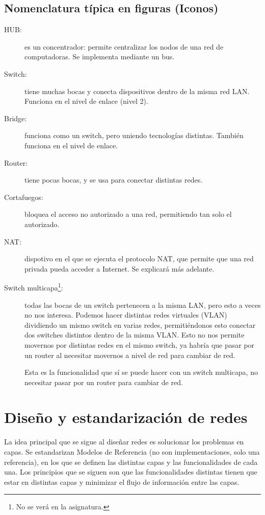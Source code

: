 \subsection{Nomenclatura típica en figuras (Iconos)}
\begin{description}
    \item[HUB:] es un concentrador: permite centralizar los nodos de una red de computadoras. Se implementa mediante un bus.
    \item[Switch:] tiene muchas bocas y conecta dispositivos dentro de la misma red \acrshort{LAN}. Funciona en el nivel de enlace (nivel 2).
    \item[Bridge:] funciona como un switch, pero uniendo tecnologías distintas. También funciona en el nivel de enlace.
    \item[Router:] tiene pocas bocas, y se usa para conectar distintas redes. 
    \item[Cortafuegos:] bloquea el acceso no autorizado a una red, permitiendo tan solo el autorizado. 
    \item[NAT:] dispotivo en el que se ejecuta el protocolo \acrfull{NAT}, que permite que una red privada pueda acceder a Internet. Se explicará más adelante.
    \item[Switch multicapa\footnote{No se verá en la asignatura.}:] todas las bocas de un switch pertenecen a la misma \acrshort{LAN}, pero esto a veces no nos interesa. Podemos hacer distintas redes virtuales (\acrshort{VLAN}) dividiendo un mismo switch en varias redes, permitiéndonos esto conectar dos switches distintos dentro de la misma VLAN\@. Esto no nos permite movernos por distintas redes en el mismo switch, ya habría que pasar por un router al necesitar movernos a nivel de red para cambiar de red.
    
    Esta es la funcionalidad que sí se puede hacer con un switch multicapa, no necesitar pasar por un router para cambiar de red.
\end{description}

\section{Diseño y estandarización de redes}

La idea principal que se sigue al diseñar redes es solucionar los problemas en capas. Se estandarizan Modelos de Referencia (no son implementaciones, solo una referencia), en los que se definen las distintas capas y las funcionalidades de cada una. Los principios que se siguen son que las funcionalidades distintas tienen que estar en distintas capas y minimizar el flujo de información entre las capas.\\

